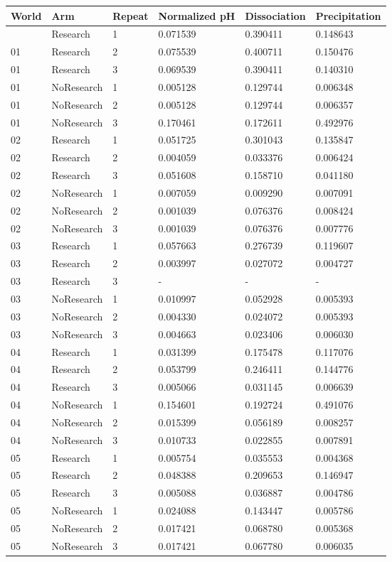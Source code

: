 \documentclass[10pt,a4paper]{article}
\begin{document}
{\def\LTcaptype{table} %
\small\begin{longtable}[]{@{}llllll@{}}
\toprule\noalign{}
World & Arm & Repeat & Normalized pH & Dissociation & Precipitation \\
\midrule\noalign{}
\endhead
\bottomrule\noalign{}
\endlastfoot
01 & Research & 1 & 0.071539 & 0.390411 & 0.148643 \\
01 & Research & 2 & 0.075539 & 0.400711 & 0.150476 \\
01 & Research & 3 & 0.069539 & 0.390411 & 0.140310 \\
01 & NoResearch & 1 & 0.005128 & 0.129744 & 0.006348 \\
01 & NoResearch & 2 & 0.005128 & 0.129744 & 0.006357 \\
01 & NoResearch & 3 & 0.170461 & 0.172611 & 0.492976 \\
02 & Research & 1 & 0.051725 & 0.301043 & 0.135847 \\
02 & Research & 2 & 0.004059 & 0.033376 & 0.006424 \\
02 & Research & 3 & 0.051608 & 0.158710 & 0.041180 \\
02 & NoResearch & 1 & 0.007059 & 0.009290 & 0.007091 \\
02 & NoResearch & 2 & 0.001039 & 0.076376 & 0.008424 \\
02 & NoResearch & 3 & 0.001039 & 0.076376 & 0.007776 \\
03 & Research & 1 & 0.057663 & 0.276739 & 0.119607 \\
03 & Research & 2 & 0.003997 & 0.027072 & 0.004727 \\
03 & Research & 3 & - & - & - \\
03 & NoResearch & 1 & 0.010997 & 0.052928 & 0.005393 \\
03 & NoResearch & 2 & 0.004330 & 0.024072 & 0.005393 \\
03 & NoResearch & 3 & 0.004663 & 0.023406 & 0.006030 \\
04 & Research & 1 & 0.031399 & 0.175478 & 0.117076 \\
04 & Research & 2 & 0.053799 & 0.246411 & 0.144776 \\
04 & Research & 3 & 0.005066 & 0.031145 & 0.006639 \\
04 & NoResearch & 1 & 0.154601 & 0.192724 & 0.491076 \\
04 & NoResearch & 2 & 0.015399 & 0.056189 & 0.008257 \\
04 & NoResearch & 3 & 0.010733 & 0.022855 & 0.007891 \\
05 & Research & 1 & 0.005754 & 0.035553 & 0.004368 \\
05 & Research & 2 & 0.048388 & 0.209653 & 0.146947 \\
05 & Research & 3 & 0.005088 & 0.036887 & 0.004786 \\
05 & NoResearch & 1 & 0.024088 & 0.143447 & 0.005786 \\
05 & NoResearch & 2 & 0.017421 & 0.068780 & 0.005368 \\
05 & NoResearch & 3 & 0.017421 & 0.067780 & 0.006035 \\
\end{longtable}\normalsize
}
\end{document}
